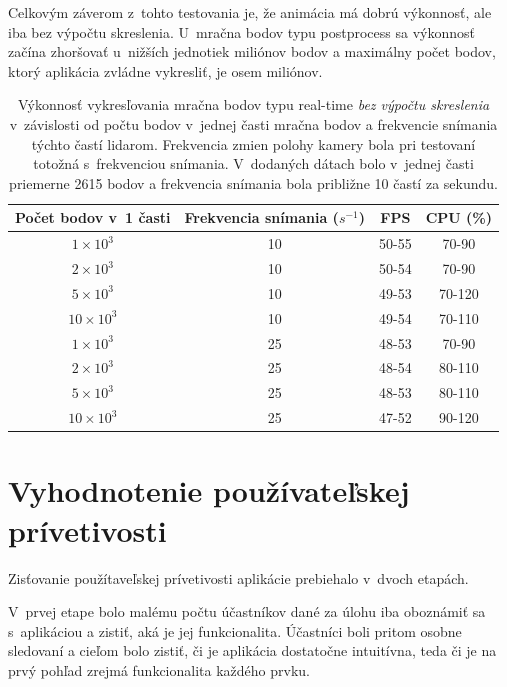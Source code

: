 Celkovým záverom z~tohto testovania je, že animácia má dobrú výkonnosť, ale iba bez výpočtu skreslenia. U~mračna bodov typu postprocess sa výkonnosť začína zhoršovať u~nižších jednotiek miliónov bodov a maximálny počet bodov, ktorý aplikácia zvládne vykresliť, je osem miliónov.

\begin{table}[t]
    \centering
    \begin{tabular}{c|c||c|c}
        Počet bodov v~1 časti & Frekvencia snímania ($s^{-1}$) & FPS & CPU (\%) \\ \hline
        { }$1\times10^3$ & 10 & 50-55 & 70-90 \\
        { }$2\times10^3$ & 10 & 50-54 & 70-90 \\
        { }$5\times10^3$ & 10 & 49-53 & 70-120 \\
        $10\times10^3$ & 10 & 49-54 & 70-110 \\ \hline
        { }$1\times10^3$ & 25 & 48-53 & 70-90 \\
        { }$2\times10^3$ & 25 & 48-54 & 80-110 \\
        { }$5\times10^3$ & 25 & 48-53 & 80-110 \\
        $10\times10^3$ & 25 & 47-52 & 90-120 \\
    \end{tabular}
    \caption{Výkonnosť vykresľovania mračna bodov typu real-time \emph{bez výpočtu skreslenia} v~závislosti od počtu bodov v~jednej časti mračna bodov a frekvencie snímania týchto častí lidarom. Frekvencia zmien polohy kamery bola pri testovaní totožná s~frekvenciou snímania. V~dodaných dátach bolo v~jednej časti priemerne 2615 bodov a frekvencia snímania bola približne 10 častí za sekundu.}
    \label{tab:vykonnost_realtime}
\end{table}

\section{Vyhodnotenie používateľskej prívetivosti}

Zisťovanie použítaveľskej prívetivosti aplikácie prebiehalo v~dvoch etapách.

V~prvej etape bolo malému počtu účastníkov dané za úlohu iba oboznámiť sa s~aplikáciou a zistiť, aká je jej funkcionalita. Účastníci boli pritom osobne sledovaní a cieľom bolo zistiť, či je aplikácia dostatočne intuitívna, teda či je na prvý pohľad zrejmá funkcionalita každého prvku.

\pagebreak

